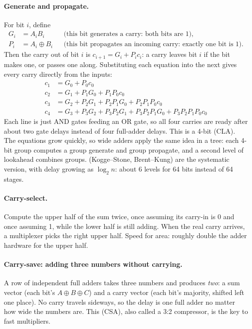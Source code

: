 \paragraph{Generate and propagate.} For bit $i$, define
\begin{align*}
  G_i &= A_i B_i && \text{(this bit generates a carry: both bits are 1)}, \\
  P_i &= A_i \oplus B_i && \text{(this bit propagates an incoming carry: exactly one bit is 1)}.
\end{align*}
Then the carry out of bit $i$ is $c_{i+1} = G_i + P_i c_i$: a carry leaves bit $i$ if the bit makes one, or passes one along. Substituting each equation into the next gives every carry directly from the inputs:
\begin{align*}
  c_1 &= G_0 + P_0 c_0 \\
  c_2 &= G_1 + P_1 G_0 + P_1 P_0 c_0 \\
  c_3 &= G_2 + P_2 G_1 + P_2 P_1 G_0 + P_2 P_1 P_0 c_0 \\
  c_4 &= G_3 + P_3 G_2 + P_3 P_2 G_1 + P_3 P_2 P_1 G_0 + P_3 P_2 P_1 P_0 c_0
\end{align*}
Each line is just AND gates feeding an OR gate, so all four carries are ready after about two gate delays instead of four full-adder delays. This is a 4-bit  (CLA). The equations grow quickly, so wide adders apply the same idea in a tree: each 4-bit group computes a group generate and group propagate, and a second level of lookahead combines groups.  (Kogge--Stone, Brent--Kung) are the systematic version, with delay growing as $\log_2 n$: about 6 levels for 64 bits instead of 64 stages.

\paragraph{Carry-select.} Compute the upper half of the sum twice, once assuming its carry-in is 0 and once assuming 1, while the lower half is still adding. When the real carry arrives, a multiplexer picks the right upper half. Speed for area: roughly double the adder hardware for the upper half.

\paragraph{Carry-save: adding three numbers without carrying.} A row of independent full adders takes three numbers and produces \emph{two}: a sum vector (each bit's $A \oplus B \oplus C$) and a carry vector (each bit's majority, shifted left one place). No carry travels sideways, so the delay is one full adder no matter how wide the numbers are. This  (CSA), also called a 3:2 compressor, is the key to fast multipliers.

